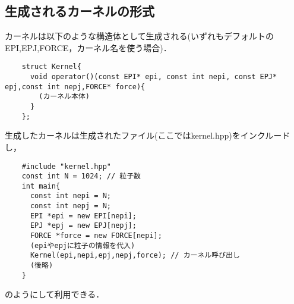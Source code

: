 \documentclass{article}
\begin{document}
  \subsection{生成されるカーネルの形式}
  カーネルは以下のような構造体として生成される(いずれもデフォルトのEPI,EPJ,FORCE，カーネル名を使う場合)．
\begin{verbatim}
	struct Kernel{
	  void operator()(const EPI* epi, const int nepi, const EPJ* epj,const int nepj,FORCE* force){
	    (カーネル本体)
	  }
	};
\end{verbatim}
生成したカーネルは生成されたファイル(ここではkernel.hpp)をインクルードし，
\begin{verbatim}
	#include "kernel.hpp"
	const int N = 1024; // 粒子数
	int main{
	  const int nepi = N;
	  const int nepj = N;
	  EPI *epi = new EPI[nepi];
	  EPJ *epj = new EPJ[nepj];
	  FORCE *force = new FORCE[nepi];
	  (epiやepjに粒子の情報を代入)
	  Kernel(epi,nepi,epj,nepj,force); // カーネル呼び出し
	  (後略)
	}
\end{verbatim}
のようにして利用できる．
\end{document}
